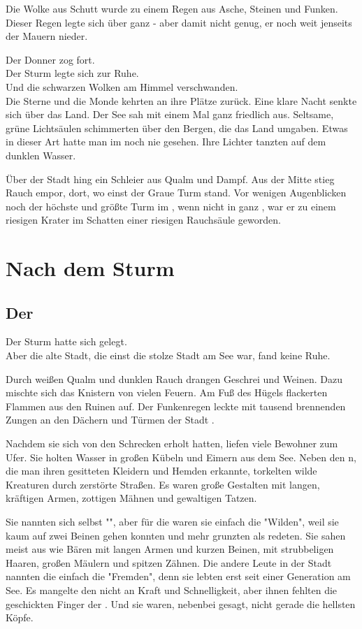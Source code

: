 \begin{huge}
\begin{itshape}
Die Wolke aus Schutt wurde zu einem Regen aus Asche, Steinen und Funken. Dieser Regen legte sich über ganz {\Tern} - aber damit nicht genug, er noch weit jenseits der Mauern nieder.

Der Donner zog fort.\\
Der Sturm legte sich zur Ruhe.\\
Und die schwarzen Wolken am Himmel verschwanden.\\
Die Sterne und die Monde kehrten an ihre Plätze zurück. 
Eine klare Nacht senkte sich über das Land. Der See sah mit einem Mal ganz friedlich aus. Seltsame, grüne Lichtsäulen schimmerten über den Bergen, die das Land umgaben. Etwas in dieser Art hatte man im {\Enland} noch nie gesehen. Ihre Lichter tanzten auf dem dunklen Wasser. 

Über der Stadt hing ein Schleier aus Qualm und Dampf. Aus der Mitte stieg Rauch empor, dort, wo einst der Graue Turm stand. Vor wenigen Augenblicken noch der höchste und größte Turm im {\Enland}, wenn nicht in ganz {\Rhingell}, war er zu einem riesigen Krater im Schatten einer riesigen Rauchsäule geworden.
\end{itshape}

\part{Nach dem Sturm}
\chapter{Der \Schattenlaufer}
Der Sturm hatte sich gelegt.\\
Aber die alte Stadt, die einst die stolze Stadt {\Tern} am See war, fand keine Ruhe.
 
Durch weißen Qualm und dunklen Rauch drangen Geschrei und Weinen. Dazu mischte sich das Knistern von vielen Feuern. Am Fuß des Hügels flackerten Flammen aus den Ruinen auf. Der Funkenregen leckte mit tausend brennenden Zungen an den Dächern und Türmen der Stadt {\Tern}. 

Nachdem sie sich von den Schrecken erholt hatten, liefen viele Bewohner zum Ufer. Sie holten Wasser in großen Kübeln und Eimern aus dem See. Neben den {\Enlaender}{n}, die man ihren gesitteten Kleidern und Hemden erkannte, torkelten wilde Kreaturen durch zerstörte Straßen. Es waren große Gestalten mit langen, kräftigen Armen, zottigen Mähnen und gewaltigen Tatzen.

Sie nannten sich selbst "{\Bangiri}", aber für die {\Enlaender} waren sie einfach die "Wilden", weil sie kaum auf zwei Beinen gehen konnten und mehr grunzten als redeten. Sie sahen meist aus wie Bären mit langen Armen und kurzen Beinen, mit strubbeligen Haaren, großen Mäulern und spitzen Zähnen. Die andere Leute in der Stadt nannten die {\Bangiri} einfach die "Fremden", denn sie lebten erst seit einer Generation am See. Es mangelte den {\Bangiri} nicht an Kraft und Schnelligkeit, aber ihnen fehlten die geschickten Finger der . Und sie waren, nebenbei gesagt, nicht gerade die hellsten Köpfe. 


\end{huge}

